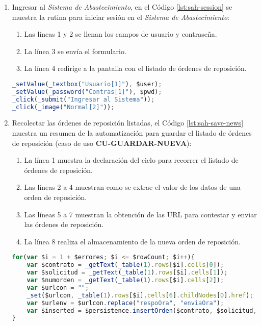 \begin{enumerate}
	\item Ingresar al \textit{Sistema de Abastecimiento}, en el Código \ref{lst:sah-session} se muestra la rutina para iniciar sesión en el \textit{Sistema de Abastecimiento}:
	\begin{enumerate}
		\item Las líneas 1 y 2 se llenan los campos de usuario y contraseña.
		\item La línea 3 se envía el formulario.
		\item La línea 4 redirige a la pantalla con el listado de órdenes de reposición.  
	\end{enumerate}

\pagebreak

	\begin{lstlisting}[language=Javascript, caption={Inicio de sesión en el \textit{Sistema de Abastecimiento}.}, captionpos=b, label={lst:sah-session}]
_setValue(_textbox("Usuario[1]"), $user);
_setValue(_password("Contras[1]"), $pwd);
_click(_submit("Ingresar al Sistema"));
_click(_image("Normal[2]"));
	\end{lstlisting}

	\item Recolectar las órdenes de reposición listadas, el Código \ref{lst:sah-save-news} muestra un resumen de la automatización para guardar el listado de órdenes de reposición (caso de uso \textbf{CU-GUARDAR-NUEVA}):
	\begin{enumerate}
		\item La línea 1 muestra la declaración del ciclo para recorrer el listado de órdenes de reposición.
		\item Las líneas 2 a 4 muestran como se extrae el valor de los datos de una orden de reposición.
		\item Las líneas 5 a 7 muestran la obtención de las URL para contestar y enviar las órdenes de reposición.
		\item La línea 8 realiza el almacenamiento de la nueva orden de reposición. 
	\end{enumerate}
	\begin{lstlisting}[language=Javascript, caption={Guardar lista de órdenes de reposición.}, captionpos=b, label={lst:sah-save-news}]
for(var $i = 1 + $errores; $i <= $rowCount; $i++){
	var $contrato = _getText(_table(1).rows[$i].cells[0]);
	var $solicitud = _getText(_table(1).rows[$i].cells[1]);
	var $numorden = _getText(_table(1).rows[$i].cells[2]);
	var $urlcon = "";
	_set($urlcon, _table(1).rows[$i].cells[6].childNodes[0].href);
	var $urlenv = $urlcon.replace("respoOra", "enviaOra");
	var $inserted = $persistence.insertOrden($contrato, $solicitud, $numorden, $expedicion, $almacen, $urlcon, $urlenv, $idSesion);
}
	\end{lstlisting}


\end{enumerate}
